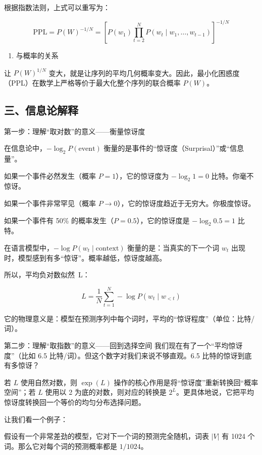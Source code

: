 根据指数法则，上式可以重写为：

\[
\mathrm{PPL}=P(W)^{-1/N}
=\left[P(w_1)\prod_{t=2}^{N}P(w_t\mid w_1,\ldots,w_{t-1})\right]^{-1/N}
\]

\begin{enumerate}
\def\labelenumi{\arabic{enumi}.}
\setcounter{enumi}{5}
\tightlist
\item
  与概率的关系
\end{enumerate}

让 \(P(W)^{1/N}\) 变大，就是让序列的平均几何概率变大。因此，最小化困惑度（PPL）在数学上严格等价于最大化整个序列的联合概率 \(P(W)\)。

\hypertarget{ux4e09ux4fe1ux606fux8bbaux89e3ux91ca}{%
\subsection{三、信息论解释}\label{ux4e09ux4fe1ux606fux8bbaux89e3ux91ca}}

第一步：理解``取对数''的意义------衡量惊讶度

在信息论中，\(-\log_2 P(\mathrm{event})\) 衡量的是事件的``惊讶度（Surprisal）''或``信息量''。

如果一个事件必然发生（概率 \(P=1\)），它的惊讶度为 \(-\log_2 1=0\) 比特。你毫不惊讶。

如果一个事件非常罕见（概率 \(P\to 0\)），它的惊讶度趋近于无穷大。你极度惊讶。

如果一个事件有 50\% 的概率发生（\(P=0.5\)），它的惊讶度是 \(-\log_2 0.5=1\) 比特。

在语言模型中，\(-\log P(w_t\mid \mathrm{context})\) 衡量的是：当真实的下一个词 \(w_t\) 出现时，模型感到有多``惊讶''。概率越低，惊讶度越高。

所以，平均负对数似然~L：

\[
L=\frac{1}{N}\sum_{t=1}^{N}-\log P(w_t\mid w_{<t})
\]

它的物理意义是：模型在预测序列中每个词时，平均的``惊讶程度''（单位：比特/词）。

第二步：理解``取指数''的意义------回到选择空间
我们现在有了一个``平均惊讶度''（比如 6.5 比特/词）。但这个数字对我们来说不够直观。6.5 比特的惊讶到底有多惊讶？

若 \(L\) 使用自然对数，则 \(\exp(L)\) 操作的核心作用是将``惊讶度''重新转换回``概率空间''；若 \(L\) 使用以 2 为底的对数，则对应的转换是 \(2^L\)。更具体地说，它把平均惊讶度转换回一个等价的均匀分布选择问题。

让我们看一个例子：

假设有一个非常差劲的模型，它对下一个词的预测完全随机，词表 \(|V|\) 有 1024 个词。那么它对每个词的预测概率都是 \(1/1024\)。

